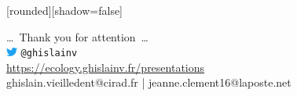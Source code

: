 
{
  [rounded][shadow=false]
  \begin{frame}[plain]
    \begin{block}{}
      \begin{center}
        \ldots~Thank you for attention~\ldots\\
        \includegraphics[height=0.3cm]{figs/Twitter_Bird.png}
        \texttt{@ghislainv}\\
        \url{https://ecology.ghislainv.fr/presentations}\\
        ghislain.vieilledent@cirad.fr | jeanne.clement16@laposte.net
      \end{center}
    \end{block}
  \end{frame}
}